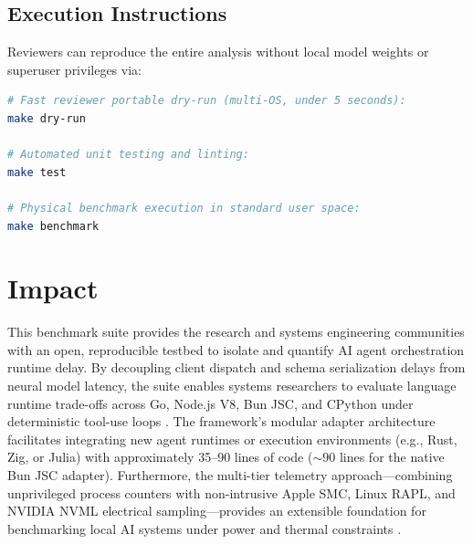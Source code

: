 \documentclass[11pt,a4paper]{article}
\begin{document}
\subsection{Execution Instructions}
Reviewers can reproduce the entire analysis without local model weights or superuser privileges via:
\begin{lstlisting}[language=bash]
# Fast reviewer portable dry-run (multi-OS, under 5 seconds):
make dry-run

# Automated unit testing and linting:
make test

# Physical benchmark execution in standard user space:
make benchmark
\end{lstlisting}

\section{Impact}
\label{sec:impact}
This benchmark suite provides the research and systems engineering communities with an open, reproducible testbed to isolate and quantify AI agent orchestration runtime delay. By decoupling client dispatch and schema serialization delays from neural model latency, the suite enables systems researchers to evaluate language runtime trade-offs across Go, Node.js V8, Bun JSC, and CPython under deterministic tool-use loops \cite{yao2023react, kwon2023vllm}. The framework's modular adapter architecture facilitates integrating new agent runtimes or execution environments (e.g., Rust, Zig, or Julia) with approximately 35--90 lines of code ($\sim 90$ lines for the native Bun JSC adapter). Furthermore, the multi-tier telemetry approach---combining unprivileged process counters with non-intrusive Apple SMC, Linux RAPL, and NVIDIA NVML electrical sampling---provides an extensible foundation for benchmarking local AI systems under power and thermal constraints \cite{barroso2007case, you2023zeus, fahad2019comparative}.
\end{document}
